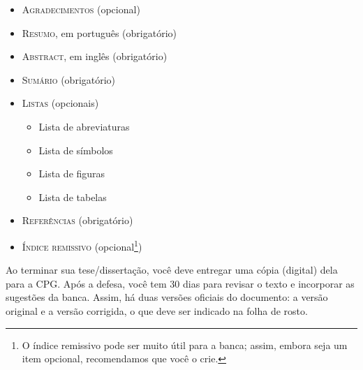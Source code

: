 \begin{itemize}
  \item \textsc{Agradecimentos} (opcional)

  \item \textsc{Resumo}, em português (obrigatório)

  \item \textsc{Abstract}, em inglês (obrigatório)

  \item \textsc{Sumário} (obrigatório)

  \item \textsc{Listas} (opcionais)
  \begin{itemize}
    \item Lista de abreviaturas
    \item Lista de símbolos
    \item Lista de figuras
    \item Lista de tabelas
  \end{itemize}

  \item \textsc{Referências} (obrigatório)

  \item \textsc{Índice remissivo} (opcional\footnote{O índice remissivo
   pode ser muito útil para a banca; assim, embora seja um item opcional,
   recomendamos que você o crie.})
\end{itemize}

Ao terminar sua tese/dissertação, você deve entregar uma cópia (digital) dela
para a CPG. Após a defesa, você tem 30 dias para revisar o texto e incorporar
as sugestões da banca. Assim, há duas versões oficiais do documento: a versão
original e a versão corrigida, o que deve ser indicado na folha de rosto.


